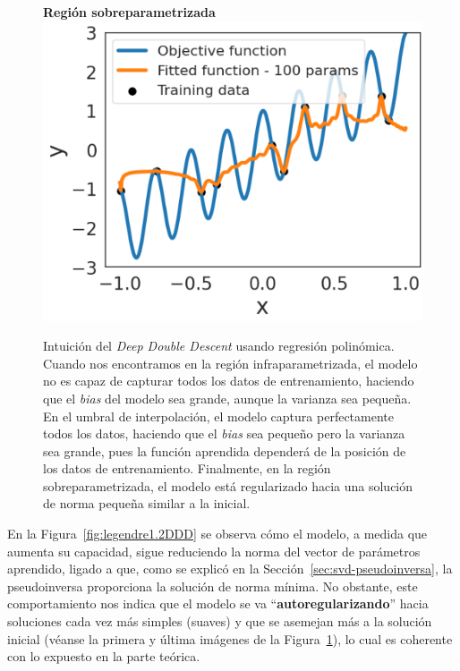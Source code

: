 \begin{figure}[h]
    \begin{minipage}{0.32\textwidth}
        \centering
        \textbf{Región sobreparametrizada} \\[0.5ex] 
        \includegraphics[width=\linewidth]{img/experiments/legendre1.3.png}
    \end{minipage}
    \caption[Intuición del \textit{Deep Double Descent} usando regresión polinómica.]{Intuición del \textit{Deep Double Descent} usando regresión polinómica. Cuando nos encontramos en la región infraparametrizada, el modelo no es capaz de capturar todos los datos de entrenamiento, haciendo que el \textit{bias} del modelo sea grande, aunque la varianza sea pequeña. En el umbral de interpolación, el modelo captura perfectamente todos los datos, haciendo que el \textit{bias} sea pequeño pero la varianza sea grande, pues la función aprendida dependerá de la posición de los datos de entrenamiento. Finalmente, en la región sobreparametrizada, el modelo está regularizado hacia una solución de norma pequeña similar a la inicial.}\label{fig:legendre1DD}
\end{figure}

En la Figura~\ref{fig:legendre1.2DDD} se observa cómo el modelo, a medida que aumenta su capacidad, sigue reduciendo la norma del vector de parámetros aprendido, ligado a que, como se explicó en la Sección~\ref{sec:svd-pseudoinversa}, la pseudoinversa proporciona la solución de norma mínima. No obstante, este comportamiento nos indica que el modelo se va ``\textbf{autoregularizando}'' hacia soluciones cada vez más simples (suaves) y que se asemejan más a la solución inicial (véanse la primera y última imágenes de la Figura~\ref{fig:legendre1DD}), lo cual es coherente con lo expuesto en la parte teórica.

